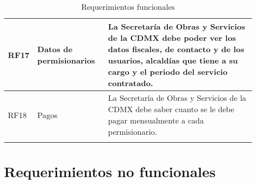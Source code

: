 \begin{longtable}{|m{1.5cm}|m{3.5cm}|m{7cm}|}
        RF17 & Datos de permisionarios &  La Secretaría de Obras y Servicios de la CDMX debe poder ver los datos fiscales, de contacto y de los usuarios, alcaldías que tiene a su cargo y el periodo del servicio contratado.     \\ \hline
        
        RF18 & Pagos & La Secretaría de Obras y Servicios de la CDMX debe saber cuanto se le debe pagar mensualmente a cada permisionario.  \\ \hline
    \caption{Requerimientos funcionales}
    \label{tab:RF}
\end{longtable}

\section{Requerimientos no funcionales}


